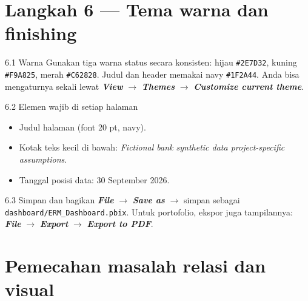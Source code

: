 \documentclass[11pt,a4paper]{article}
\newcommand{\file}[1]{\texttt{\small #1}}
\newcommand{\ui}[1]{\textbf{\textit{#1}}}
\begin{document}
\section{Langkah 6 --- Tema warna dan finishing}

\begin{stepbox}{6.1 Warna}
Gunakan tiga warna status secara konsisten: hijau \texttt{\#2E7D32}, kuning \texttt{\#F9A825}, merah \texttt{\#C62828}. Judul dan header memakai navy \texttt{\#1F2A44}. Anda bisa mengaturnya sekali lewat \ui{View} $\rightarrow$ \ui{Themes} $\rightarrow$ \ui{Customize current theme}.
\end{stepbox}

\begin{stepbox}{6.2 Elemen wajib di setiap halaman}
\begin{itemize}
\item Judul halaman (font 20 pt, navy).
\item Kotak teks kecil di bawah: \emph{Fictional bank \textbullet{} synthetic data \textbullet{} project-specific assumptions}.
\item Tanggal posisi data: 30 September 2026.
\end{itemize}
\end{stepbox}

\begin{stepbox}{6.3 Simpan dan bagikan}
\ui{File} $\rightarrow$ \ui{Save as} $\rightarrow$ simpan sebagai \file{dashboard/ERM\_Dashboard.pbix}. Untuk portofolio, ekspor juga tampilannya: \ui{File} $\rightarrow$ \ui{Export} $\rightarrow$ \ui{Export to PDF}.
\end{stepbox}

\section{Pemecahan masalah relasi dan visual}
\end{document}
